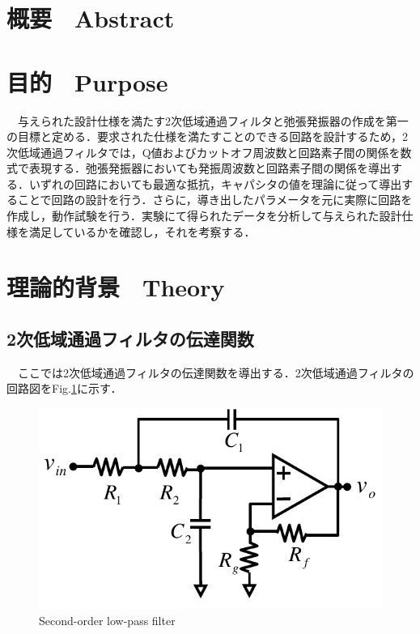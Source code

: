 




\fontsize{11.041pt}{16.562pt}\selectfont

\section{概要　Abstract}

\section{目的　Purpose}
　与えられた設計仕様を満たす2次低域通過フィルタと弛張発振器の作成を第一の目標と定める．要求された仕様を満たすことのできる回路を設計するため，2次低域通過フィルタでは，Q値およびカットオフ周波数と回路素子間の関係を数式で表現する．弛張発振器においても発振周波数と回路素子間の関係を導出する．いずれの回路においても最適な抵抗，キャパシタの値を理論に従って導出することで回路の設計を行う．さらに，導き出したパラメータを元に実際に回路を作成し，動作試験を行う．実験にて得られたデータを分析して与えられた設計仕様を満足しているかを確認し，それを考察する．


\section{理論的背景　Theory}
\subsection{2次低域通過フィルタの伝達関数}
　ここでは2次低域通過フィルタの伝達関数を導出する．2次低域通過フィルタの回路図をFig.\ref{fig:2D_LPF}に示す．
\begin{figure}[H]
    \centering
    \includegraphics[scale=0.5]{./fig/2D_LPF.pdf}
    \caption{Second-order low-pass filter}
    \label{fig:2D_LPF}
\end{figure}


